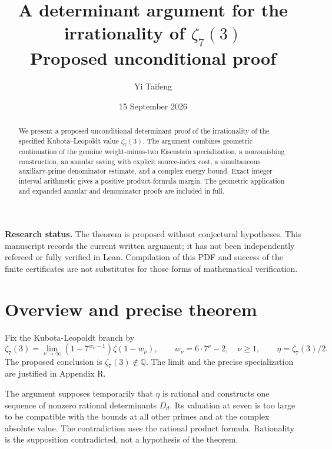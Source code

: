 \documentclass[11pt,a4paper]{article}
\title{A determinant argument for the irrationality of \(\zeta_7(3)\)\\[6pt]\large Proposed unconditional proof}
\author{Yi Taifeng}
\date{15 September 2026}
\begin{document}
\maketitle
\begin{abstract}
We present a proposed unconditional determinant proof of the irrationality of the specified Kubota--Leopoldt value \(\zeta_7(3)\). The argument combines geometric continuation of the genuine weight-minus-two Eisenstein specialization, a nonvanishing construction, an annular saving with explicit source-index cost, a simultaneous auxiliary-prime denominator estimate, and a complex energy bound. Exact integer interval arithmetic gives a positive product-formula margin. The geometric application and expanded annular and denominator proofs are included in full.
\end{abstract}
\textbf{Research status.} The theorem is proposed without conjectural hypotheses. This manuscript records the current written argument; it has not been independently refereed or fully verified in Lean. Compilation of this PDF and success of the finite certificates are not substitutes for those forms of mathematical verification.
\clearpage
\tableofcontents
\clearpage
\hypertarget{overview-and-precise-theorem}{%
\section{Overview and precise theorem}\label{overview-and-precise-theorem}}

Fix the Kubota-Leopoldt branch by \[
\zeta_7(3)=\lim_{\nu\to\infty}(1-7^{w_\nu-1})\zeta(1-w_\nu),
\qquad w_\nu=6\cdot7^\nu-2,\quad \nu\ge1,
\qquad \eta=\zeta_7(3)/2.
\] The proposed conclusion is \(\zeta_7(3)\notin\mathbb Q\). The limit and the precise specialization are justified in Appendix R.

The argument supposes temporarily that \(\eta\) is rational and constructs one sequence of nonzero rational determinants \(D_d\). Its valuation at seven is too large to be compatible with the bounds at all other primes and at the complex absolute value. The contradiction uses the rational product formula. Rationality is the supposition contradicted, not a hypothesis of the theorem.
\end{document}
